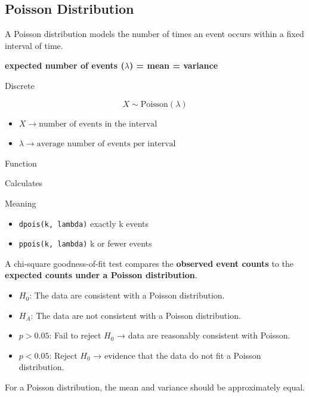 \documentclass[
  letterpaper,
  DIV=11,
  numbers=noendperiod]{scrreprt}
\providecommand{\tightlist}{%
  \setlength{\itemsep}{0pt}\setlength{\parskip}{0pt}}
\begin{document}
\subsection{Poisson Distribution}\label{poisson-distribution}

A Poisson distribution models the number of times an event occurs within
a fixed interval of time.

\textbf{expected number of events (\(\lambda\)) = mean = variance}

Discrete

\[X\sim\text{Poisson}(\lambda)\]

\begin{itemize}
\tightlist
\item
  \(X \rightarrow \text{number of events in the interval}\)
\item
  \(\lambda \rightarrow \text{average number of events per interval}\)
\end{itemize}

Function

Calculates

Meaning

\begin{itemize}
\tightlist
\item
  \texttt{dpois(k,\ lambda)} exactly k events
\item
  \texttt{ppois(k,\ lambda)} k or fewer events
\end{itemize}

\begin{description}
\tightlist
\item[Chi-Square Goodness-of-Fit Test]
A chi-square goodness-of-fit test compares the \textbf{observed event
counts} to the \textbf{expected counts under a Poisson distribution}.
\end{description}

\begin{itemize}
\item
  \(H_0\): The data are consistent with a Poisson distribution.
\item
  \(H_A\): The data are not consistent with a Poisson distribution.
\item
  \(p > 0.05\): Fail to reject \(H_0\) → data are reasonably consistent
  with Poisson.
\item
  \(p < 0.05\): Reject \(H_0\) → evidence that the data do not fit a
  Poisson distribution.
\end{itemize}

\begin{description}
\tightlist
\item[Overdispersion Check]
For a Poisson distribution, the mean and variance should be
approximately equal.
\end{description}
\end{document}
